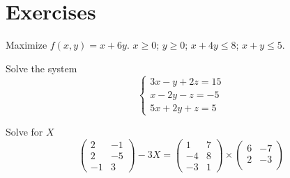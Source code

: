 \section{\large Exercises}

\begin{exer}
    Maximize $f(x,y) = x + 6y$. $x \geq 0$; $y \geq 0$; $x + 4y \leq 8$; $x + y \leq 5$.
\end{exer}

\begin{exer}
    Solve the system
    \[
        \begin{cases}
            3x - y + 2z = 15\\
            x - 2y - z = -5\\
            5x + 2y + z = 5
        \end{cases}
    \]
\end{exer}


\begin{exer}
    Solve for $X$
    \begin{equation*}
        \begin{pmatrix}
            2 & -1\\
            2 & -5\\
            -1 & 3
        \end{pmatrix} - 3X =
        \begin{pmatrix}
            1 & 7\\
            -4 & 8\\
            -3 & 1
        \end{pmatrix}
        \times
        \begin{pmatrix}
            6 & -7\\
            2 & -3\\
        \end{pmatrix}
    \end{equation*}
\end{exer}